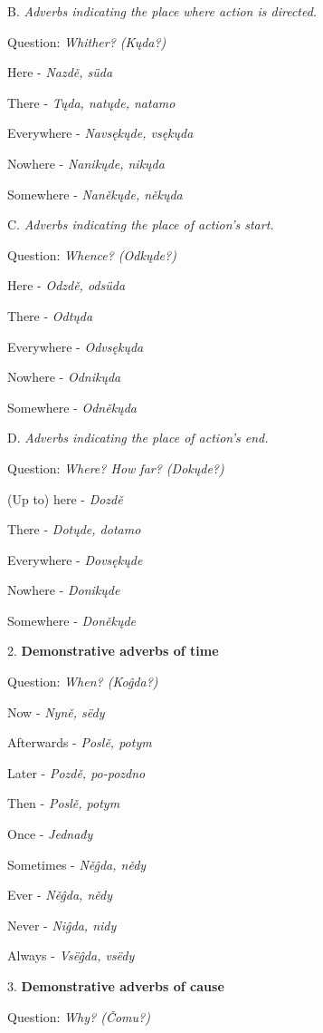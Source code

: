 B. \textit{Adverbs indicating the place where action is directed. }

Question: \textit{Whither? (Kųda?)}

Here - \textit{Nazdě, süda}

There - \textit{Tųda, natųde, natamo}

Everywhere - \textit{Navsękųde, vsękųda}

Nowhere - \textit{Nanikųde, nikųda}

Somewhere - \textit{Naněkųde, někųda}


C. \textit{Adverbs indicating the place of action’s start.}

Question: \textit{Whence? (Odkųde?)}

Here - \textit{Odzdě, odsüda}

There - \textit{Odtųda}

Everywhere - \textit{Odvsękųda}

Nowhere - \textit{Odnikųda}

Somewhere - \textit{Odněkųda}


D. \textit{Adverbs indicating the place of action’s end.}

Question: \textit{Where? How far? (Dokųde?)}

(Up to) here - \textit{Dozdě}

There - \textit{Dotųde, dotamo}

Everywhere - \textit{Dovsękųde}

Nowhere - \textit{Donikųde}

Somewhere - \textit{Doněkųde}


2. \textbf{Demonstrative adverbs of time}

Question: \textit{When? (Koĝda?)}

Now - \textit{Nyně, sëdy}

Afterwards - \textit{Poslě, potym}

Later - \textit{Pozdě, po-pozdno}

Then - \textit{Poslě, potym}

Once - \textit{Jednađy}

Sometimes - \textit{Něĝda, nědy}

Ever - \textit{Něĝda, nědy}

Never - \textit{Niĝda, nidy}

Always - \textit{Vsëĝda, vsëdy}

3. \textbf{Demonstrative adverbs of cause}

Question: \textit{Why? (Čomu?)}

